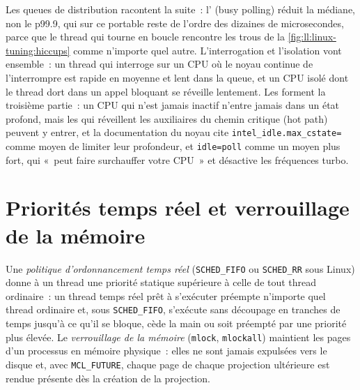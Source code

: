 Les queues de distribution racontent la suite~: l' (busy polling) réduit la médiane, non le p99.9, qui sur ce portable reste de l'ordre des dizaines de microsecondes,
parce que le thread qui tourne en boucle rencontre les trous de la \cref{fig:ll:linux-tuning:hiccups} comme n'importe quel autre. L'interrogation et l'isolation vont
ensemble~: un thread qui interroge sur un CPU où le noyau continue de l'interrompre est rapide en moyenne et lent dans la queue, et un
CPU isolé dont le thread dort dans un appel bloquant se réveille lentement. Les  forment la troisième partie~: un CPU qui n'est jamais
inactif n'entre jamais dans un état profond, mais les  qui réveillent les auxiliaires du chemin critique (hot path) peuvent y entrer, et la documentation du noyau
cite \texttt{intel\_idle.max\_cstate=} comme moyen de limiter leur profondeur, et \texttt{idle=poll} comme un moyen plus fort, qui «~peut
faire surchauffer votre CPU~» et désactive les fréquences turbo.

\section{Priorités temps réel et verrouillage de la mémoire}\label{sec:ll:linux-tuning:rt}

\begin{definition}\label{def:ll:linux-tuning:rt}
Une \emph{politique d'ordonnancement temps réel} (\texttt{SCHED\_FIFO} ou \texttt{SCHED\_RR} sous
Linux) donne à un thread une priorité statique supérieure à celle de tout thread ordinaire~: un thread temps réel prêt à s'exécuter préempte n'importe quel thread ordinaire et,
sous \texttt{SCHED\_FIFO}, s'exécute sans découpage en tranches de temps jusqu'à ce qu'il se bloque, cède la main ou soit préempté par une priorité plus élevée.
Le \emph{verrouillage de la mémoire} (\texttt{mlock}, \texttt{mlockall}) maintient les pages d'un processus en mémoire physique~:
elles ne sont jamais expulsées vers le disque et, avec \texttt{MCL\_FUTURE}, chaque page de chaque projection ultérieure est rendue présente dès la
création de la projection.
\end{definition}

